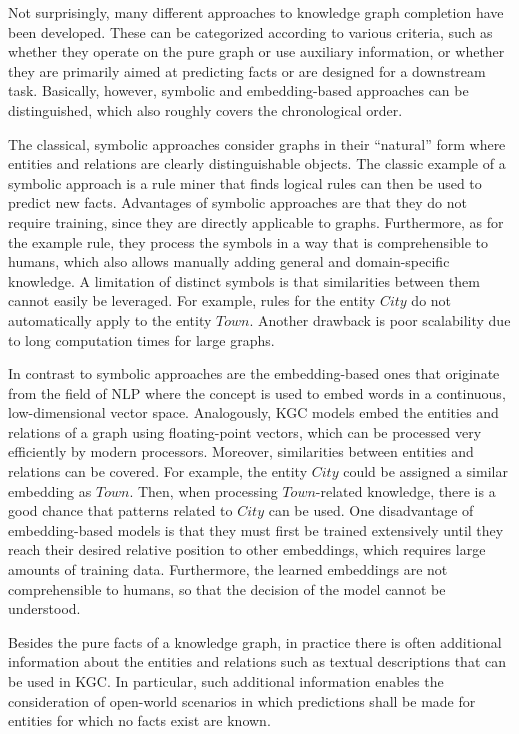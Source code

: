 Not surprisingly, many different approaches to knowledge graph completion have been developed. These can be categorized according to various criteria, such as whether they operate on the pure graph or use auxiliary information, or whether they are primarily aimed at predicting facts or are designed for a downstream task. Basically, however, symbolic and embedding-based approaches can be distinguished, which also roughly covers the chronological order.

The classical, symbolic approaches consider graphs in their ``natural'' form where entities and relations are clearly distinguishable objects. The classic example of a symbolic approach is a rule miner that finds logical rules can then be used to predict new facts. Advantages of symbolic approaches are that they do not require training, since they are directly applicable to graphs. Furthermore, as for the example rule, they process the symbols in a way that is comprehensible to humans, which also allows manually adding general and domain-specific knowledge. A limitation of distinct symbols is that similarities between them cannot easily be leveraged. For example, rules for the entity $City$ do not automatically apply to the entity $Town$. Another drawback is poor scalability due to long computation times for large graphs.

In contrast to symbolic approaches are the embedding-based ones that originate from the field of NLP where the concept is used to embed words in a continuous, low-dimensional vector space. Analogously, KGC models embed the entities and relations of a graph using floating-point vectors, which can be processed very efficiently by modern processors. Moreover, similarities between entities and relations can be covered. For example, the entity $City$ could be assigned a similar embedding as $Town$. Then, when processing $Town$-related knowledge, there is a good chance that patterns related to $City$ can be used. One disadvantage of embedding-based models is that they must first be trained extensively until they reach their desired relative position to other embeddings, which requires large amounts of training data. Furthermore, the learned embeddings are not comprehensible to humans, so that the decision of the model cannot be understood.

Besides the pure facts of a knowledge graph, in practice there is often additional information about the entities and relations such as textual descriptions that can be used in KGC. In particular, such additional information enables the consideration of open-world scenarios in which predictions shall be made for entities for which no facts exist are known.

